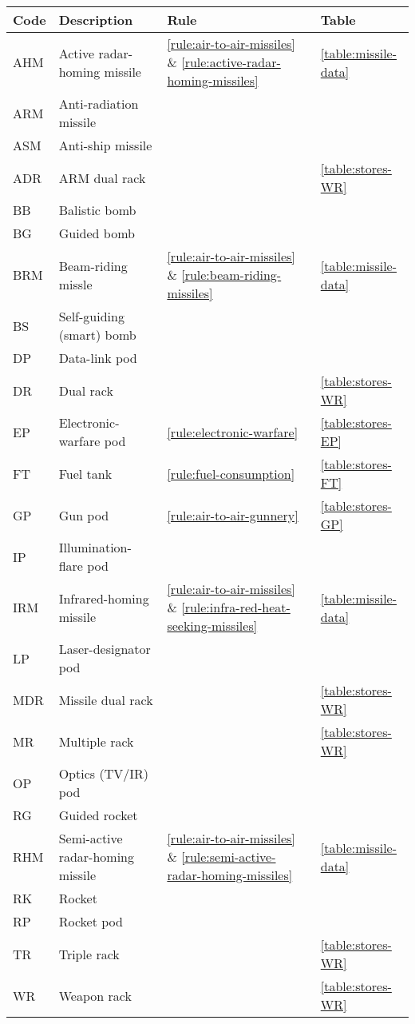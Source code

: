 \begin{twocolumntable}[t]

\begin{tabular}{llll}
\toprule
Code&Description&Rule&Table\\
\midrule
AHM&Active radar-homing missile&\ref{rule:air-to-air-missiles} \& \ref{rule:active-radar-homing-missiles}&\ref{table:missile-data}\\
ARM&Anti-radiation missile\\
ASM&Anti-ship missile\\
ADR&ARM dual rack&&\ref{table:stores-WR}\\
BB&Balistic bomb\\
BG&Guided bomb\\
BRM&Beam-riding missle&\ref{rule:air-to-air-missiles} \& \ref{rule:beam-riding-missiles}&\ref{table:missile-data}\\
BS&Self-guiding (smart) bomb\\
DP&Data-link pod\\
DR&Dual rack&&\ref{table:stores-WR}\\
EP&Electronic-warfare pod&\ref{rule:electronic-warfare}&\ref{table:stores-EP}\\
FT&Fuel tank&\ref{rule:fuel-consumption}&\ref{table:stores-FT}\\
GP&Gun pod&\ref{rule:air-to-air-gunnery}&\ref{table:stores-GP}\\
IP&Illumination-flare pod\\
IRM&Infrared-homing missile&\ref{rule:air-to-air-missiles} \& \ref{rule:infra-red-heat-seeking-missiles}&\ref{table:missile-data}\\
LP&Laser-designator pod\\
MDR&Missile dual rack&&\ref{table:stores-WR}\\
MR&Multiple rack&&\ref{table:stores-WR}\\
OP&Optics (TV/IR) pod\\
RG&Guided rocket\\
RHM&Semi-active radar-homing missile&\ref{rule:air-to-air-missiles} \& \ref{rule:semi-active-radar-homing-missiles}&\ref{table:missile-data}\\
RK&Rocket\\
RP&Rocket pod\\
TR&Triple rack&&\ref{table:stores-WR}\\
WR&Weapon rack&&\ref{table:stores-WR}\\
\bottomrule
\end{tabular}

\end{twocolumntable}